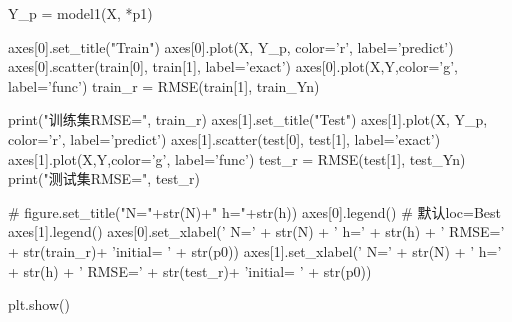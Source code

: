 \begin{python}
Y_p = model1(X, *p1)

axes[0].set_title("Train")
axes[0].plot(X, Y_p, color='r', label='predict')
axes[0].scatter(train[0], train[1], label='exact')
axes[0].plot(X,Y,color='g', label='func')
train_r = RMSE(train[1], train_Yn)

print("训练集RMSE=", train_r)
axes[1].set_title("Test")
axes[1].plot(X, Y_p, color='r', label='predict')
axes[1].scatter(test[0], test[1], label='exact')
axes[1].plot(X,Y,color='g', label='func')
test_r = RMSE(test[1], test_Yn)
print("测试集RMSE=", test_r)

# figure.set_title("N="+str(N)+" h="+str(h))
axes[0].legend()  # 默认loc=Best
axes[1].legend()
axes[0].set_xlabel(' N=' + str(N) + ' h=' + str(h) + ' RMSE=' + str(train_r)+ '\nparameter initial= ' + str(p0))
axes[1].set_xlabel(' N=' + str(N) + ' h=' + str(h) + ' RMSE=' + str(test_r)+ '\nparameter initial= ' + str(p0))


plt.show()


\end{python}

